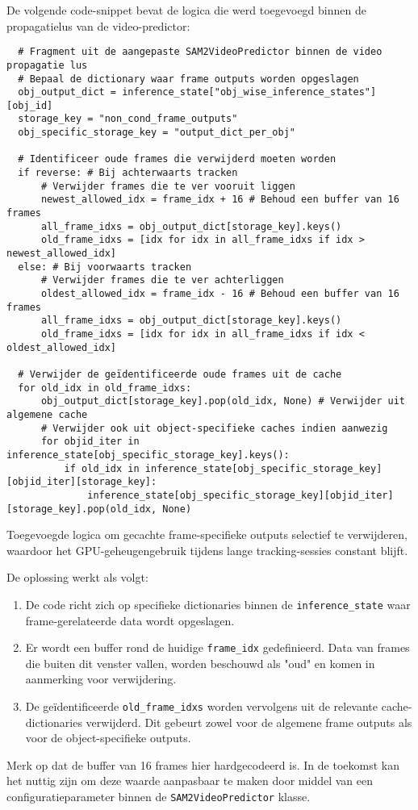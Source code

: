 De volgende code-snippet bevat de logica die werd toegevoegd binnen de propagatielus van de video-predictor:
\begin{listing}[H]
  \begin{verbatim}
  # Fragment uit de aangepaste SAM2VideoPredictor binnen de video propagatie lus
  # Bepaal de dictionary waar frame outputs worden opgeslagen
  obj_output_dict = inference_state["obj_wise_inference_states"][obj_id]
  storage_key = "non_cond_frame_outputs"
  obj_specific_storage_key = "output_dict_per_obj"

  # Identificeer oude frames die verwijderd moeten worden
  if reverse: # Bij achterwaarts tracken
      # Verwijder frames die te ver vooruit liggen
      newest_allowed_idx = frame_idx + 16 # Behoud een buffer van 16 frames
      all_frame_idxs = obj_output_dict[storage_key].keys()
      old_frame_idxs = [idx for idx in all_frame_idxs if idx > newest_allowed_idx]
  else: # Bij voorwaarts tracken
      # Verwijder frames die te ver achterliggen
      oldest_allowed_idx = frame_idx - 16 # Behoud een buffer van 16 frames
      all_frame_idxs = obj_output_dict[storage_key].keys()
      old_frame_idxs = [idx for idx in all_frame_idxs if idx < oldest_allowed_idx]

  # Verwijder de geïdentificeerde oude frames uit de cache
  for old_idx in old_frame_idxs:
      obj_output_dict[storage_key].pop(old_idx, None) # Verwijder uit algemene cache
      # Verwijder ook uit object-specifieke caches indien aanwezig
      for objid_iter in inference_state[obj_specific_storage_key].keys():
          if old_idx in inference_state[obj_specific_storage_key][objid_iter][storage_key]:
              inference_state[obj_specific_storage_key][objid_iter][storage_key].pop(old_idx, None)
  \end{verbatim}
  \caption[Geheugenoptimalisatie in SAM2 door caching van frame outputs]{Toegevoegde logica om gecachte frame-specifieke outputs selectief te verwijderen, waardoor het GPU-geheugengebruik tijdens lange tracking-sessies constant blijft.}
  \label{lst:sam2-memory-fix}
\end{listing}

De oplossing werkt als volgt:
\begin{enumerate}
  \item De code richt zich op specifieke dictionaries binnen de \texttt{inference\_state} waar frame-gerelateerde data wordt opgeslagen.
  \item Er wordt een buffer rond de huidige \texttt{frame\_idx} gedefinieerd. Data van frames die buiten dit venster vallen, worden beschouwd als "oud" en komen in aanmerking voor verwijdering.
  \item De geïdentificeerde \texttt{old\_frame\_idxs} worden vervolgens uit de relevante cache-dictionaries verwijderd. Dit gebeurt zowel voor de algemene frame outputs als voor de object-specifieke outputs.
\end{enumerate}
Merk op dat de buffer van 16 frames hier hardgecodeerd is. 
In de toekomst kan het nuttig zijn om deze waarde aanpasbaar te maken door middel van een configuratieparameter binnen de \texttt{SAM2VideoPredictor} klasse.

